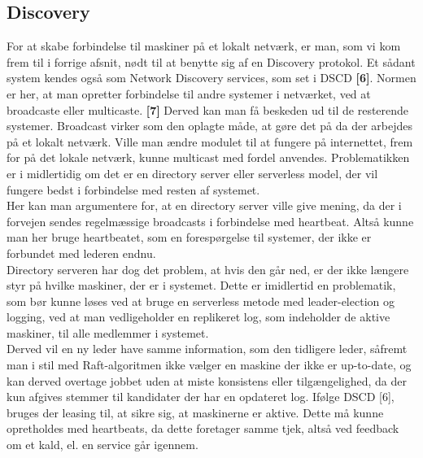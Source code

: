 \documentclass[a4paper,12pt]{article}
\begin{document}
\subsection{Discovery}
For at skabe forbindelse til maskiner på et lokalt netværk, er man, som vi kom frem til i forrige afsnit, nødt til at benytte sig af en Discovery protokol. Et sådant system kendes også som Network Discovery services, som set i DSCD \textbf{[6]}. Normen er her, at man opretter forbindelse til andre systemer i netværket, ved at broadcaste eller multicaste. \textbf{[7]} Derved kan man få beskeden ud til de resterende systemer. Broadcast virker som den oplagte måde, at gøre det på da der arbejdes på et lokalt netværk.
Ville man ændre modulet til at fungere på internettet, frem for på det lokale netværk, kunne multicast med fordel anvendes.
Problematikken er i midlertidig om det er en directory server eller serverless model, der vil fungere bedst i forbindelse med resten af systemet.
\\[5px]
Her kan man argumentere for, at en directory server ville give mening, da der i forvejen sendes regelmæssige broadcasts i forbindelse med heartbeat. Altså kunne man her bruge heartbeatet, som en forespørgelse til systemer, der ikke er forbundet med lederen endnu.
\\
Directory serveren har dog det problem, at hvis den går ned, er der ikke længere styr på hvilke maskiner, der er i systemet. Dette er imidlertid en problematik, som bør kunne løses ved at bruge en serverless metode med leader-election og logging, ved at man vedligeholder en replikeret log, som indeholder de aktive maskiner, til alle medlemmer i systemet. 
\\
Derved vil en ny leder have samme information, som den tidligere leder, såfremt man i stil med Raft-algoritmen ikke vælger en maskine der ikke er up-to-date, og kan derved overtage jobbet uden at miste konsistens eller tilgængelighed, da der kun afgives stemmer til kandidater der har en opdateret log. Ifølge DSCD [6], bruges der leasing til, at sikre sig, at maskinerne er aktive. Dette må kunne opretholdes med heartbeats, da dette foretager samme tjek, altså ved feedback om et kald, el. en service går igennem.
\end{document}
